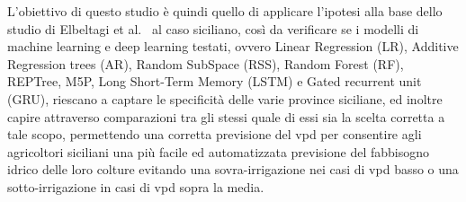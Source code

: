L'obiettivo di questo studio è quindi quello di applicare l'ipotesi alla base dello studio di Elbeltagi et al.~\cite{elbeltagi2023vpd} al caso siciliano, così da verificare se i modelli di machine learning e deep learning testati, ovvero  Linear Regression (LR), Additive Regression trees (AR), Random SubSpace (RSS), Random Forest (RF), REPTree, M5P, Long Short-Term Memory (LSTM) e Gated recurrent unit (GRU), riescano a captare le specificità delle varie province siciliane, ed inoltre capire attraverso comparazioni tra gli stessi quale di essi sia la scelta corretta a tale scopo, permettendo una corretta previsione del vpd per consentire agli agricoltori siciliani una più facile ed automatizzata previsione del fabbisogno idrico delle loro colture evitando una sovra-irrigazione nei casi di vpd basso o una sotto-irrigazione in casi di vpd sopra la media.
\label{sec:introduction}